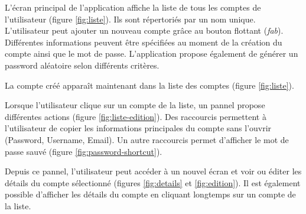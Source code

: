 L'écran principal de l'application affiche la liste de tous les comptes de l'utilisateur (figure \ref{fig:liste}). Ils sont répertoriés par un nom unique. L'utilisateur peut ajouter un nouveau compte grâce au bouton flottant (\emph{fab}). Différentes informations peuvent être spécifiées au moment de la création du compte ainsi que le mot de passe. L'application \easypass{} propose également de générer un password aléatoire selon différents critères. 

\begin{center}
	\begin{minipage}{.3\textwidth}
	\end{minipage}
	\begin{minipage}{.3\textwidth}
	\end{minipage}
	\begin{minipage}{.3\textwidth}
	\end{minipage}        
\end{center}

La compte créé apparaît maintenant dans la liste des comptes (figure \ref{fig:liste}). 

Lorsque l'utilisateur clique sur un compte de la liste, un pannel propose différentes actions (figure \ref{fig:liste-edition}). Des raccourcis permettent à l'utilisateur de copier les informations principales du compte sans l'ouvrir (Password, Username, Email). Un autre raccourcis permet d'afficher le mot de passe sauvé (figure \ref{fig:password-shortcut}). 

Depuis ce pannel, l'utilisateur peut accéder à un nouvel écran et voir ou éditer les détails du compte sélectionné (figures \ref{fig:details} et \ref{fig:edition}). Il est également possible d'afficher les détails du compte en cliquant longtemps sur un compte de la liste.

\begin{center}
	\begin{minipage}{.3\textwidth}
	\end{minipage}
	\begin{minipage}{.3\textwidth}
	\end{minipage}
	\begin{minipage}{.3\textwidth}
	\end{minipage}        
\end{center}




